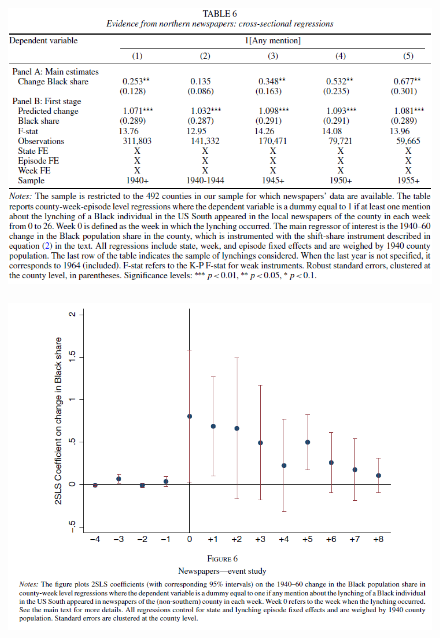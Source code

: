 \documentclass[dvipdfmx,11pt]{beamer}
\begin{document}
\begin{frame}{}
  \begin{figure}
    \centering
    \includegraphics[scale = .5]{fig_tab/os20220708/T6.png}
  \end{figure}
\end{frame}

\begin{frame}{}
  \begin{figure}
    \centering
    \includegraphics[scale = .5]{fig_tab/os20220708/F6.png}
  \end{figure}
\end{frame}
\end{document}
